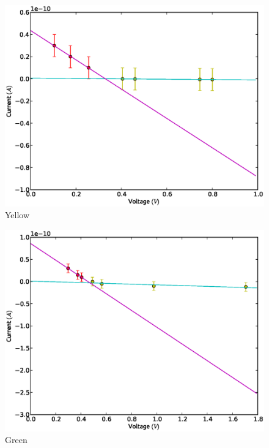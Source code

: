 \documentclass[aps,nofootinbib,onecolumn,groupedaddress,a4paper]{revtex4}
\begin{document}
\begin{figure}[h]
\caption{Yellow \label{rawplot}}
\includegraphics[width=1.0 \columnwidth]{yellow.eps}
\end{figure}

\begin{figure}[h]
\caption{Green \label{rawplot}}
\includegraphics[width=1.0 \columnwidth]{green.eps}
\end{figure}
\end{document}

